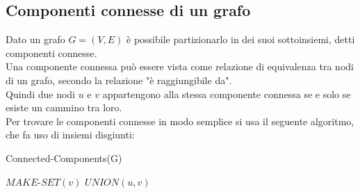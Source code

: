 \documentclass[]{article}
\begin{document}
\subsection{Componenti connesse di un grafo}
Dato un grafo $G =(V,E)$ è possibile partizionarlo in dei suoi sottoinsiemi, detti componenti connesse.\\
Una componente connessa può essere vista come relazione di equivalenza tra nodi di un grafo, secondo la relazione "è raggiungibile da".\\
Quindi due nodi $u$ e $v$ appartengono alla stessa componente connessa se e solo se esiste un cammino tra loro.\\
Per trovare le componenti connesse in modo semplice si usa il seguente algoritmo, che fa uso di insiemi disgiunti:
\begin{algorithm}
\caption{Connected-Components(G)}
\begin{algorithmic}[1]
	\STATE $MAKE\mbox{-}SET(v)$
\ENDFOR 
{}
	\STATE $UNION(u,v)$	
	\ENDIF
\ENDFOR
\end{algorithmic}
\end{algorithm}
\end{document}
